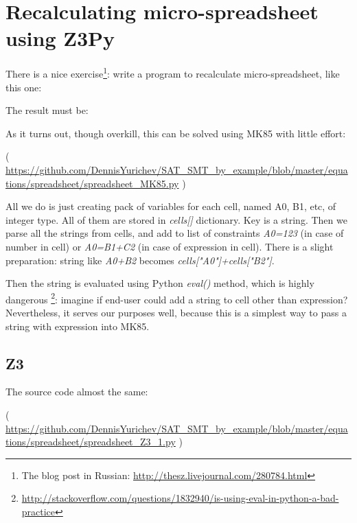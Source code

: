 \section{Recalculating micro-spreadsheet using Z3Py}
\label{spreadsheet}

\renewcommand{\CURPATH}{equations/spreadsheet}

There is a nice exercise\footnote{The blog post in Russian: \url{http://thesz.livejournal.com/280784.html}}:
write a program to recalculate micro-spreadsheet, like this one:



The result must be:



As it turns out, though overkill, this can be solved using MK85 with little effort:



( \url{https://github.com/DennisYurichev/SAT_SMT_by_example/blob/master/equations/spreadsheet/spreadsheet_MK85.py} )

All we do is just creating pack of variables for each cell, named A0, B1, etc, of integer type.
All of them are stored in \emph{cells[]} dictionary.
Key is a string.
Then we parse all the strings from cells, and add to list of constraints \emph{A0=123}
(in case of number in cell) or \emph{A0=B1+C2} (in case of expression in cell).
There is a slight preparation: string like \emph{A0+B2} becomes \emph{cells["A0"]+cells["B2"]}.

Then the string is evaluated using Python \emph{eval()} method,
which is highly dangerous
\footnote{\url{http://stackoverflow.com/questions/1832940/is-using-eval-in-python-a-bad-practice}}:
imagine if end-user could add a string to cell other than expression?
Nevertheless, it serves our purposes well, because this is a simplest way to pass a string with expression into MK85.

\subsection{Z3}

The source code almost the same:



( \url{https://github.com/DennisYurichev/SAT_SMT_by_example/blob/master/equations/spreadsheet/spreadsheet_Z3_1.py} )

